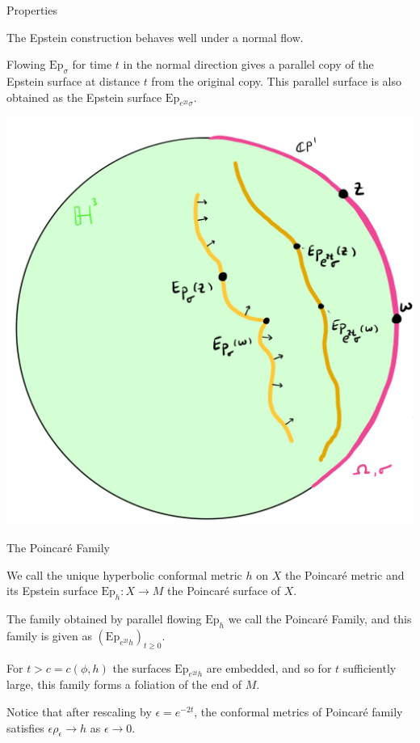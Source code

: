 \documentclass[professionalfont]{beamer}
\begin{document}
\begin{frame}{Properties}

The Epstein construction behaves well under a normal flow. 

Flowing $\mathrm{Ep}_\sigma$ for time $t$ in the normal direction gives a parallel copy of the Epstein surface at distance $t$ from the original copy. This parallel surface is also obtained as the Epstein surface $\mathrm{Ep}_{e^{2t}\sigma}$.

\centering\includegraphics[scale=0.09]{Parallel-11.jpg}

\end{frame}




\begin{frame}{The Poincar\'e Family}



We call the unique hyperbolic conformal metric $h$ on $X$ the Poincar\'e metric and its Epstein surface $\mathrm{Ep}_h: X \to M$ the Poincar\'e surface of $X$. 
\newline \pause

The family obtained by parallel flowing $\mathrm{Ep}_h$ we call the Poincar\'e Family, and this family is given as $(\mathrm{Ep}_{e^{2t}h})_{t\geq 0}$.
\newline \pause

For $t > c = c(\phi, h)$ the surfaces $\mathrm{Ep}_{e^{2t}h}$ are embedded, and so for $t$ sufficiently large, this family forms a foliation of the end of $M$.
\newline \pause

Notice that after rescaling by $\epsilon = e^{-2t}$, the conformal metrics of Poincar\'e family satisfies $\epsilon \rho_\epsilon \to h$ as $\epsilon \to 0$.


\end{frame}
\end{document}
